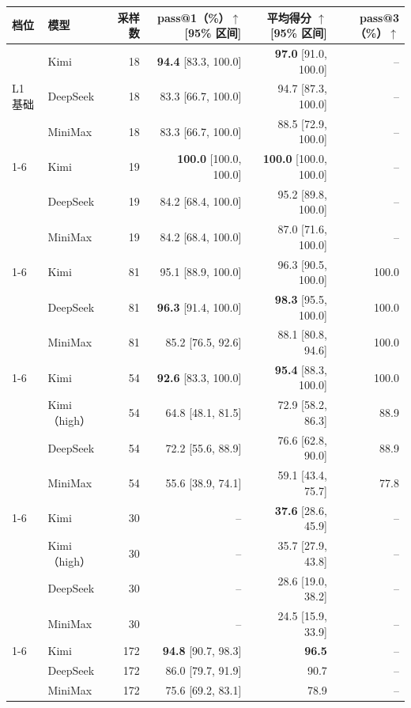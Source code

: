 \begin{tabular}{@{}llrrrr@{}}
\toprule
档位 & 模型 & 采样数 & pass@1（\%）$\uparrow$ [95\% 区间] & 平均得分 $\uparrow$ [95\% 区间] & pass@3（\%）$\uparrow$ \\
\midrule
\multirow{3}{*}{L1 基础} & Kimi & 18 & \textbf{94.4} [83.3, 100.0] & \textbf{97.0} [91.0, 100.0] & -- \\
 & DeepSeek & 18 & 83.3 [66.7, 100.0] & 94.7 [87.3, 100.0] & -- \\
 & MiniMax & 18 & 83.3 [66.7, 100.0] & 88.5 [72.9, 100.0] & -- \\
\cmidrule(lr){1-6}
\multirow{3}{*}{L2 中等} & Kimi & 19 & \textbf{100.0} [100.0, 100.0] & \textbf{100.0} [100.0, 100.0] & -- \\
 & DeepSeek & 19 & 84.2 [68.4, 100.0] & 95.2 [89.8, 100.0] & -- \\
 & MiniMax & 19 & 84.2 [68.4, 100.0] & 87.0 [71.6, 100.0] & -- \\
\cmidrule(lr){1-6}
\multirow{3}{*}{L3 困难} & Kimi & 81 & 95.1 [88.9, 100.0] & 96.3 [90.5, 100.0] & 100.0 \\
 & DeepSeek & 81 & \textbf{96.3} [91.4, 100.0] & \textbf{98.3} [95.5, 100.0] & 100.0 \\
 & MiniMax & 81 & 85.2 [76.5, 92.6] & 88.1 [80.8, 94.6] & 100.0 \\
\cmidrule(lr){1-6}
\multirow{4}{*}{L4 顶尖} & Kimi & 54 & \textbf{92.6} [83.3, 100.0] & \textbf{95.4} [88.3, 100.0] & 100.0 \\
 & Kimi（high） & 54 & 64.8 [48.1, 81.5] & 72.9 [58.2, 86.3] & 88.9 \\
 & DeepSeek & 54 & 72.2 [55.6, 88.9] & 76.6 [62.8, 90.0] & 88.9 \\
 & MiniMax & 54 & 55.6 [38.9, 74.1] & 59.1 [43.4, 75.7] & 77.8 \\
\cmidrule(lr){1-6}
\multirow{4}{*}{L5 开放式} & Kimi & 30 & -- & \textbf{37.6} [28.6, 45.9] & -- \\
 & Kimi（high） & 30 & -- & 35.7 [27.9, 43.8] & -- \\
 & DeepSeek & 30 & -- & 28.6 [19.0, 38.2] & -- \\
 & MiniMax & 30 & -- & 24.5 [15.9, 33.9] & -- \\
\cmidrule(lr){1-6}
\multirow{3}{*}{L1--L4 合计} & Kimi & 172 & \textbf{94.8} [90.7, 98.3] & \textbf{96.5} & -- \\
 & DeepSeek & 172 & 86.0 [79.7, 91.9] & 90.7 & -- \\
 & MiniMax & 172 & 75.6 [69.2, 83.1] & 78.9 & -- \\
\bottomrule
\end{tabular}
